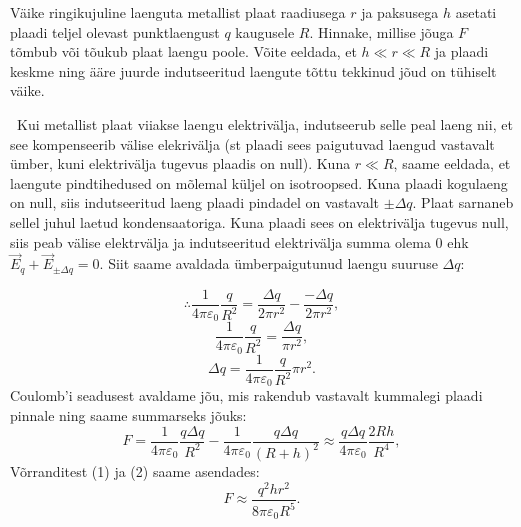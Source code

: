 
Väike ringikujuline laenguta metallist plaat raadiusega $r$ ja paksusega $h$ asetati plaadi teljel olevast punktlaengust $q$ kaugusele $R$. Hinnake, millise jõuga $F$ tõmbub või tõukub plaat laengu poole. Võite eeldada, et $h\ll r\ll R$ ja plaadi keskme ning ääre juurde indutseeritud laengute tõttu tekkinud jõud on tühiselt väike. 


\hint

\solu
\
Kui metallist plaat viiakse laengu elektrivälja, indutseerub selle peal laeng nii, et see kompenseerib välise elekrivälja (st plaadi sees paigutuvad laengud vastavalt ümber, kuni elektrivälja tugevus plaadis on null). Kuna $r \ll R$, saame eeldada, et laengute pindtihedused on mõlemal küljel on isotroopsed. Kuna plaadi kogulaeng on null, siis indutseeritud laeng plaadi pindadel on vastavalt $\pm \Delta q$. Plaat sarnaneb sellel juhul laetud kondensaatoriga. Kuna plaadi sees on elektrivälja tugevus null, siis peab välise elektrvälja ja indutseeritud elektrivälja summa olema $0$ ehk $\vec{E}_q + \vec{E}_{\pm \Delta q}=0$. Siit saame avaldada ümberpaigutunud laengu suuruse $\Delta q$:

$$\therefore \frac{1}{4\pi \varepsilon_0} \frac{q}{R^2} = \frac{\Delta q}{2 \pi r^2} - \frac{-\Delta q}{2 \pi r^2},$$
$$\frac{1}{4\pi \varepsilon_0} \frac{q}{R^2} = \frac{\Delta q}{\pi r^2},$$
\begin{equation}
\Delta q = \frac{1}{4\pi \varepsilon_0} \frac{q}{R^2} \pi r^2.
\end{equation}
Coulomb'i seadusest avaldame jõu, mis rakendub vastavalt kummalegi plaadi pinnale ning saame summarseks jõuks:
\begin{equation}
F = \frac{1}{4 \pi \varepsilon_0} \frac{q \Delta q}{R^2} - \frac{1}{4 \pi \varepsilon_0} \frac{q \Delta q}{(R+h)^2} \approx \frac{q \Delta q}{4 \pi \varepsilon_0} \frac{2Rh}{R^4},
\end{equation}
Võrranditest (1) ja (2) saame asendades:
$$F \approx \frac{q^2 h r^2}{8 \pi \varepsilon_0 R^5}.$$
\probend